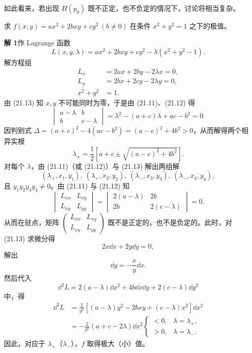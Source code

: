 如此看来，若出现 $H(p_0)$ 既不正定，也不负定的情况下，讨论将相当复杂。

\begin{xexample}[21.4.1]
求 $f(x,y)=ax^2+2bxy+cy^2\ (b\ne0)$ 在条件 $x^2+y^2=1$ 之下的极值。
\end{xexample}
\begin{xsolution}
\textbf{解 1}\quad 作 Lagrange 函数
\[
  L(x,y,\lambda)=ax^2+2bxy+cy^2-\lambda(x^2+y^2-1).
\]
解方程组
\begin{align}
  L_x&=2ax+2by-2\lambda x=0, \tag{21.11}\label{eq:21.11}\\
  L_y&=2bx+2cy-2\lambda y=0, \tag{21.12}\label{eq:21.12}\\
  x^2+y^2&=1. \tag{21.13}\label{eq:21.13}
\end{align}
由 (21.13) 知 $x,y$ 不可能同时为零，于是由 (21.11)、(21.12) 得
\begin{equation}
  \begin{vmatrix}a-\lambda&b\\ b&c-\lambda\end{vmatrix}
  =\lambda^2-(a+c)\lambda+ac-b^2=0.
  \tag{21.14}
  \label{eq:21.14}
\end{equation}
因判别式 $\Delta=(a+c)^2-4(ac-b^2)=(a-c)^2+4b^2>0$，从而解得两个相异实根
\[
  \lambda_\pm=\frac12\left[a+c\pm\sqrt{(a-c)^2+4b^2}\right].
\]
对每个 $\lambda$，由 (21.11)（或 (21.12)）与 (21.13) 解出两组解
\[
  (\lambda_+,x_1,y_1),\ (\lambda_+,x_2,y_2),\ (\lambda_-,x_3,y_3),\ (\lambda_-,x_4,y_4),
\]
且 $y_1y_2y_3y_4\ne0$。由 (21.11) 与 (21.12) 知
\[
  \begin{vmatrix}L_{xx}&L_{xy}\\L_{xy}&L_{yy}\end{vmatrix}
  =\begin{vmatrix}2(a-\lambda)&2b\\2b&2(c-\lambda)\end{vmatrix}=0.
\]
从而在驻点，矩阵 $\begin{pmatrix}L_{xx}&L_{xy}\\L_{xy}&L_{yy}\end{pmatrix}$ 既不是正定的，也不是负定的。此时，对 (21.13) 求微分得
\[
  2x\dd x+2y\dd y=0,
\]
解出
\[
  \dd y=-\frac{x}{y}\dd x.
\]
然后代入
\[
  \dd^2L=2(a-\lambda)\dd x^2+4b\dd x\dd y+2(c-\lambda)\dd y^2
\]
中，得
\[
\begin{aligned}
  \dd^2L
  &=\frac2{y^2}[(a-\lambda)y^2-2bxy+(c-\lambda)x^2]\dd x^2\\
  &=-\frac2{y^2}(a+c-2\lambda)\dd x^2
  \begin{cases}
    <0,&\lambda=\lambda_+,\\
    >0,&\lambda=\lambda_-.
  \end{cases}
\end{aligned}
\]
因此，对应于 $\lambda_+$（$\lambda_-$），$f$ 取得极大（小）值。


\end{xsolution}
